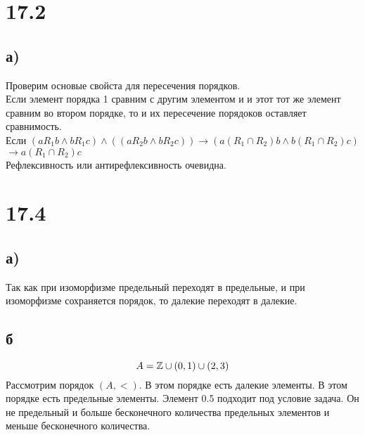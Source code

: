 

	\section*{17.2}
	\subsection*{а)}
	Проверим  основые свойста для пересечения порядков.\\
	Если элемент порядка 1 сравним с другим элементом и и этот тот же элемент сравним во втором порядке, то и их пересечение порядоков оставляет сравнимость.\\
	Если $(aR_1b\wedge bR_1c) \wedge((aR_2b\wedge bR_2c) )\to (a(R_1\cap R_2)b\wedge b(R_1\cap R_2)c)$  $\to a(R_1\cap R_2)c$ \\
	 Рефлексивность или антирефлексивность очевидна. 
	\section*{17.4}
	\subsection*{а)}
	Так как при изоморфизме предельный переходят в предельные, и при изоморфизме сохраняется порядок, то далекие переходят в далекие.
	\subsection*{б}
	$$A = \mathbb{Z} \cup (0,1) \cup (2,3)$$
	Рассмотрим порядок $(A,<)$. В этом порядке есть далекие элементы. В этом порядке есть предельные элементы. Элемент 0.5 подходит под условие задача. Он не предельный  и больше бесконечного количества предельных элементов и меньше бесконечного количества.	

